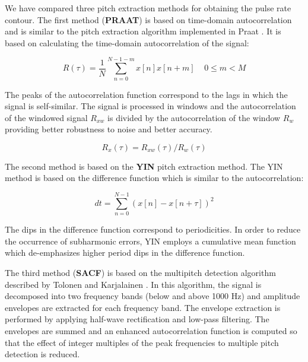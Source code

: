 We have compared three pitch extraction methods for obtaining the
pulse rate contour. The first method ({\bf PRAAT}) is based on
time-domain autocorrelation and is similar to the pitch extraction
algorithm implemented in Praat \cite{boersma93}. It is based on
calculating the time-domain autocorrelation of the signal:

\begin{equation} 
R(\tau) = \frac{1}{N} \sum_{n=0}^{N-1-m} x[n] x[n+m] \;\;\;\; 0 \leq m
< M 
\end{equation} 

The peaks of the autocorrelation function correspond to the lags 
in which the signal is self-similar. The signal is processed in
windows and the autocorrelation of the windowed signal $R_{xw}$ is divided 
by the autocorrelation of the window $R_{w}$ providing better robustness to 
noise and better accuracy. 

\begin{equation}
R_{x}(\tau) = R_{xw}(\tau) / R_{w}(\tau)
\end{equation} 


The second method is based on the {\bf YIN} pitch extraction method.  The YIN method is 
based on the difference function which is similar to the
autocorrelation: 

\begin{equation}
d{t} = \sum_{n=0}^{N-1} (x[n] - x[n+\tau])^{2}
\end{equation} 

The dips in the difference function correspond to periodicities. 
In order to reduce the occurrence of subharmonic errors, YIN employs a
cumulative mean function which de-emphasizes higher period dips 
in the difference function. 

The third method ({\bf SACF}) is based on the multipitch detection algorithm
described by Tolonen and Karjalainen \cite{tolonen00}.  In this algorithm, the
signal is decomposed into two frequency bands (below and above 1000
Hz) and amplitude envelopes are extracted for each frequency band. The
envelope extraction is performed by applying half-wave rectification
and low-pass filtering.  The envelopes are summed and an enhanced
autocorrelation function is computed so that the effect of integer
multiples of the peak frequencies to multiple pitch detection is
reduced.




